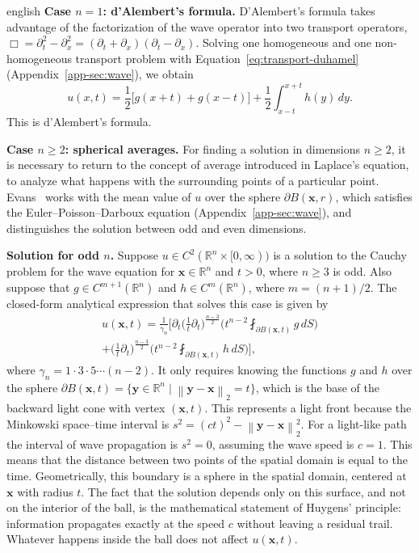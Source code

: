 \documentclass[11pt,letterpaper,twoside,openright]{book} %
\newcommand{\norm}[1]{\left\lVert #1 \right\rVert}
\begin{document}
\begin{hyphenrules}{english}
\textbf{Case $n=1$: d'Alembert's formula.}
D'Alembert's formula takes advantage of the factorization of the wave operator into two transport
operators, $\Box=\partial_t^2-\partial_x^2=(\partial_t+\partial_x)(\partial_t-\partial_x)$. Solving one
homogeneous and one non-homogeneous transport problem with Equation~\eqref{eq:transport-duhamel}
(Appendix~\ref{app-sec:wave}), we obtain
\begin{equation}
  u(x,t)=\frac12\big[g(x+t)+g(x-t)\big]+\frac12\int_{x-t}^{x+t}h(y)\,d y.
  \label{eq:dalembert}
\end{equation}
This is d'Alembert's formula.

\textbf{Case $n\ge2$: spherical averages.}
For finding a solution in dimensions $n\ge2$, it is necessary to return to the concept of average
introduced in Laplace's equation, to analyze what happens with the surrounding points of a particular
point. Evans~\cite{evans2010} works with the mean value of $u$ over the sphere $\partial B(\mathbf{x},r)$,
which satisfies the Euler--Poisson--Darboux equation (Appendix~\ref{app-sec:wave}), and distinguishes the
solution between odd and even dimensions.

\textbf{Solution for odd $n$.}
Suppose $u\in C^2(\mathbb{R}^n\times[0,\infty))$ is a solution to the Cauchy problem for the wave equation for
$\mathbf{x}\in\mathbb{R}^n$ and $t>0$, where $n\ge3$ is odd. Also suppose that $g\in C^{m+1}(\mathbb{R}^n)$ and
$h\in C^m(\mathbb{R}^n)$, where $m=(n+1)/2$. The closed-form analytical expression that solves this case is
given by \cite{evans2010}
\begin{multline}
  u(\mathbf{x},t)=\frac{1}{\gamma_n}\Bigg[\partial_t\Big(\frac1t\partial_t\Big)^{\frac{n-3}{2}}
    \Big(t^{n-2}\fint_{\partial B(\mathbf{x},t)}g\,d S\Big)\\
    +\Big(\frac1t\partial_t\Big)^{\frac{n-3}{2}}\Big(t^{n-2}\fint_{\partial B(\mathbf{x},t)}h\,d S\Big)\Bigg],
  \label{eq:wave-odd}
\end{multline}
where $\gamma_n=1\cdot3\cdot5\cdots(n-2)$. It only requires knowing the functions $g$ and $h$ over the
sphere $\partial B(\mathbf{x},t)=\{\mathbf{y}\in\mathbb{R}^n\mid\norm{\mathbf{y}-\mathbf{x}}_2=t\}$, which is the base of the backward light
cone with vertex $(\mathbf{x},t)$. This represents a light front because the Minkowski space--time interval is
$s^2=(ct)^2-\norm{\mathbf{y}-\mathbf{x}}_2^2$. For a light-like path the interval of wave propagation is $s^2=0$,
assuming the wave speed is $c=1$. This means that the distance between two points of the spatial domain
is equal to the time. Geometrically, this boundary is a sphere in the spatial domain, centered at $\mathbf{x}$
with radius $t$. The fact that the solution depends only on this surface, and not on the interior of
the ball, is the mathematical statement of Huygens' principle: information propagates exactly at the
speed $c$ without leaving a residual trail. Whatever happens inside the ball does not affect $u(\mathbf{x},t)$.


\end{hyphenrules}
\end{document}
